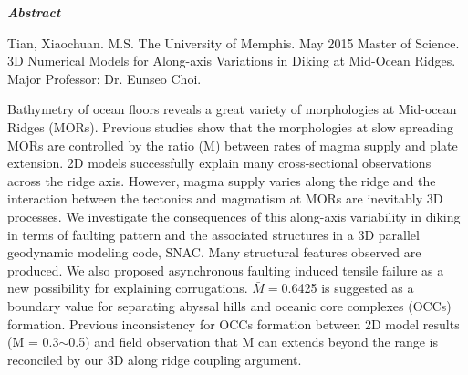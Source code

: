 \begin{center}
\textbf{\textit{Abstract}}
\end{center}

\vspace{0.5cm}

\begin{singlespace*}
Tian, Xiaochuan. M.S. The University of Memphis. May 2015 Master of Science. 3D Numerical Models for Along-axis Variations in Diking at Mid-Ocean Ridges. Major Professor: Dr. Eunseo Choi.
\end{singlespace*}

\vspace{0.5cm}

Bathymetry of ocean floors reveals a great variety of morphologies at Mid-ocean Ridges (MORs). Previous studies show that the morphologies at slow spreading MORs are controlled by the ratio (M) between rates of magma supply and plate extension. 2D models successfully explain many cross-sectional observations across the ridge axis. However, magma supply varies along the ridge and the interaction between the tectonics and magmatism at MORs are inevitably 3D processes. We investigate the consequences of this along-axis variability in diking in terms of faulting pattern and the associated structures in a 3D parallel geodynamic modeling code, SNAC. Many structural features observed are produced. We also proposed asynchronous faulting induced tensile failure as a new possibility for explaining corrugations. $\bar{M} =$0.6425 is suggested as a boundary value for separating abyssal hills and oceanic core complexes (OCCs) formation. Previous inconsistency for OCCs formation between 2D model results (M = 0.3$\sim$0.5) and field observation that M can extends beyond the range is reconciled by our 3D along ridge coupling argument.  

